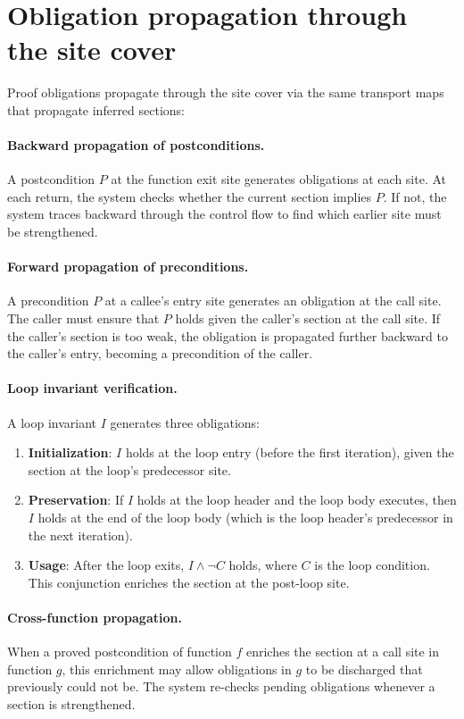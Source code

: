 \documentclass[11pt]{report}
\DeclareRobustCommand{\py}[1]{\texttt{\detokenize{#1}}}
\theoremstyle{definition}
\theoremstyle{plain}
\begin{document}
\section{Obligation propagation through the site cover}

Proof obligations propagate through the site cover via the same transport
maps that propagate inferred sections:

\paragraph{Backward propagation of postconditions.}
A postcondition $P$ at the function exit site generates obligations at each
\py{return} site. At each return, the system checks whether the current
section implies $P$. If not, the system traces backward through the control
flow to find which earlier site must be strengthened.

\paragraph{Forward propagation of preconditions.}
A precondition $P$ at a callee's entry site generates an obligation at the
call site. The caller must ensure that $P$ holds given the caller's section
at the call site. If the caller's section is too weak, the obligation is
propagated further backward to the caller's entry, becoming a precondition of
the caller.

\paragraph{Loop invariant verification.}
A loop invariant $I$ generates three obligations:
\begin{enumerate}[nosep]
  \item \textbf{Initialization}: $I$ holds at the loop entry (before the
        first iteration), given the section at the loop's predecessor site.
  \item \textbf{Preservation}: If $I$ holds at the loop header and the loop
        body executes, then $I$ holds at the end of the loop body (which is
        the loop header's predecessor in the next iteration).
  \item \textbf{Usage}: After the loop exits, $I \wedge \neg C$ holds, where
        $C$ is the loop condition. This conjunction enriches the section at
        the post-loop site.
\end{enumerate}

\paragraph{Cross-function propagation.}
When a proved postcondition of function $f$ enriches the section at a call
site in function $g$, this enrichment may allow obligations in $g$ to be
discharged that previously could not be. The system re-checks pending
obligations whenever a section is strengthened.
\end{document}
